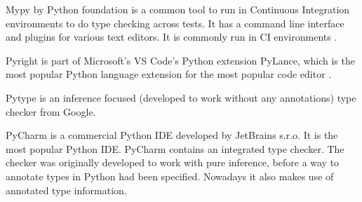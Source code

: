 Mypy by Python foundation is a common tool to run in Continuous Integration environments to do type checking across tests. It has a command line interface and plugins for various text editors. It is commonly run in CI environments \citetemp.

Pyright is part of Microsoft's VS Code's Python extension PyLance, which is the most popular Python language extension for the most popular code editor \citetemp.

Pytype is an inference focused (developed to work without any annotations) type checker from Google. 

PyCharm is a commercial Python IDE developed by JetBrains s.r.o. It is the most popular Python IDE. PyCharm contains an integrated type checker. The checker was originally developed to work with pure inference, before a way to annotate types in Python had been specified. Nowadays it also makes use of annotated type information. 


